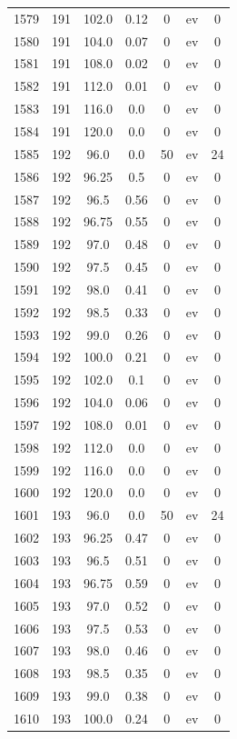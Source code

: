 \documentclass[12pt,a4paper]{article}
\begin{document}
\begin{tabular}{r|cccccc}
	1579 & 191 & 102.0 & 0.12 & 0 & ev & 0 \\
	1580 & 191 & 104.0 & 0.07 & 0 & ev & 0 \\
	1581 & 191 & 108.0 & 0.02 & 0 & ev & 0 \\
	1582 & 191 & 112.0 & 0.01 & 0 & ev & 0 \\
	1583 & 191 & 116.0 & 0.0 & 0 & ev & 0 \\
	1584 & 191 & 120.0 & 0.0 & 0 & ev & 0 \\
	1585 & 192 & 96.0 & 0.0 & 50 & ev & 24 \\
	1586 & 192 & 96.25 & 0.5 & 0 & ev & 0 \\
	1587 & 192 & 96.5 & 0.56 & 0 & ev & 0 \\
	1588 & 192 & 96.75 & 0.55 & 0 & ev & 0 \\
	1589 & 192 & 97.0 & 0.48 & 0 & ev & 0 \\
	1590 & 192 & 97.5 & 0.45 & 0 & ev & 0 \\
	1591 & 192 & 98.0 & 0.41 & 0 & ev & 0 \\
	1592 & 192 & 98.5 & 0.33 & 0 & ev & 0 \\
	1593 & 192 & 99.0 & 0.26 & 0 & ev & 0 \\
	1594 & 192 & 100.0 & 0.21 & 0 & ev & 0 \\
	1595 & 192 & 102.0 & 0.1 & 0 & ev & 0 \\
	1596 & 192 & 104.0 & 0.06 & 0 & ev & 0 \\
	1597 & 192 & 108.0 & 0.01 & 0 & ev & 0 \\
	1598 & 192 & 112.0 & 0.0 & 0 & ev & 0 \\
	1599 & 192 & 116.0 & 0.0 & 0 & ev & 0 \\
	1600 & 192 & 120.0 & 0.0 & 0 & ev & 0 \\
	1601 & 193 & 96.0 & 0.0 & 50 & ev & 24 \\
	1602 & 193 & 96.25 & 0.47 & 0 & ev & 0 \\
	1603 & 193 & 96.5 & 0.51 & 0 & ev & 0 \\
	1604 & 193 & 96.75 & 0.59 & 0 & ev & 0 \\
	1605 & 193 & 97.0 & 0.52 & 0 & ev & 0 \\
	1606 & 193 & 97.5 & 0.53 & 0 & ev & 0 \\
	1607 & 193 & 98.0 & 0.46 & 0 & ev & 0 \\
	1608 & 193 & 98.5 & 0.35 & 0 & ev & 0 \\
	1609 & 193 & 99.0 & 0.38 & 0 & ev & 0 \\
	1610 & 193 & 100.0 & 0.24 & 0 & ev & 0 \\

\end{tabular}
\end{document}
